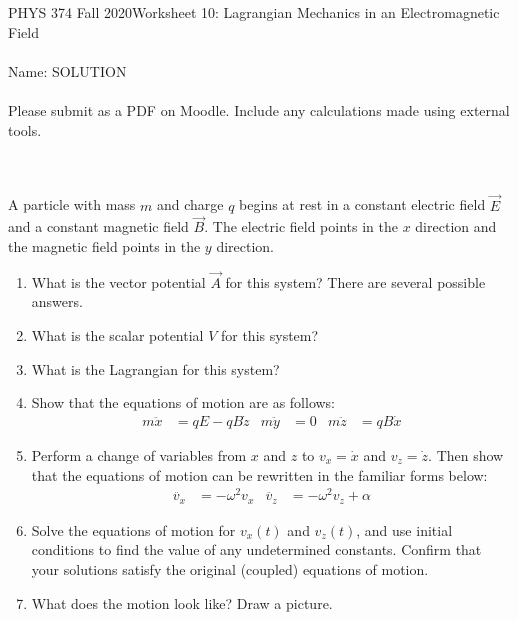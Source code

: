 \documentclass[12pt]{article}
\newcommand{\purple}[1]{{\color{purple} #1}}
\begin{document}
PHYS 374 Fall 2020\hfill Worksheet 10: Lagrangian Mechanics in an Electromagnetic Field\\
\\
Name: \purple{SOLUTION}\\
\\
Please submit as a PDF on Moodle. Include any calculations made using external tools.

\hrulefill
\\
\\
A particle with mass $m$ and charge $q$ begins at rest in a constant electric field $\vec{E}$ and a constant magnetic field $\vec{B}$. The electric field points in the $x$ direction and the magnetic field points in the $y$ direction. 
\begin{enumerate}
    \item What is the vector potential $\vec{A}$ for this system? There are several possible answers.
    \item What is the scalar potential $V$ for this system?
    \item What is the Lagrangian for this system? 
    \item Show that the equations of motion are as follows:
    \begin{align*}
        m \ddot{x} &= qE - qB\dot{z} &
        m \ddot{y} &= 0 &
        m \ddot{z} &= qB \dot{x}
    \end{align*}
    \item Perform a change of variables from $x$ and $z$ to $v_x=\dot{x}$ and $v_z=\dot{z}$. Then show that the equations of motion can be rewritten in the familiar forms below:
    \begin{align*}
        \ddot{v_x} &= -\omega^2 v_x &
        \ddot{v_z} &= -\omega^2 v_z + \alpha
    \end{align*}
    \item Solve the equations of motion for $v_x(t)$ and $v_z(t)$, and use initial conditions to find the value of any undetermined constants. Confirm that your solutions satisfy the original (coupled) equations of motion. 
    \item What does the motion look like? Draw a picture. 
\end{enumerate}
\end{document}

